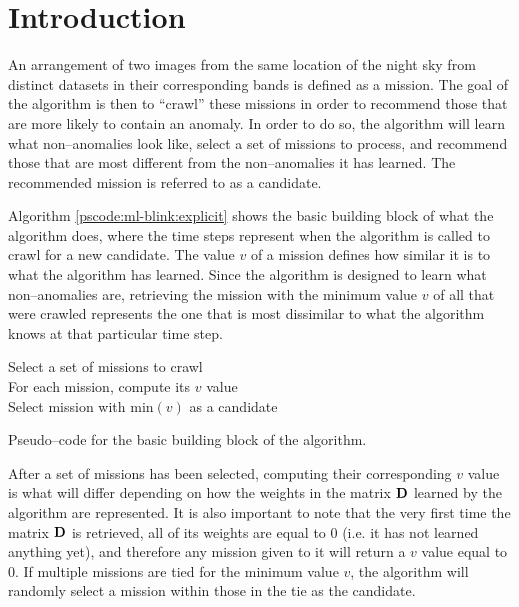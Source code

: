 \section{Introduction} \label{sect:meth:intro}

An arrangement of two images from the same location of the night sky from distinct datasets in their corresponding bands is defined as a mission. The goal of the \mlblink algorithm is then to ``crawl'' these missions in order to recommend those that are more likely to contain an anomaly. In order to do so, the \mlblink algorithm will learn what non--anomalies look like,  select a set of missions to process, and recommend those that are most different from the non--anomalies it has learned. The recommended mission is referred to as a candidate.  \newline

Algorithm \ref{pscode:ml-blink:explicit} shows the basic building block of what the \mlblink algorithm does, where the time steps represent when the algorithm is called to crawl for a new candidate. The value $v$ of a mission defines how similar it is to what the \mlblink algorithm has learned. Since the \mlblink algorithm is designed to learn what non--anomalies are, retrieving the mission with the minimum value $v$ of all that were crawled represents the one that is most dissimilar to what the \mlblink algorithm knows at that particular time step.

\vspace{0.4cm}
\begin{algorithm}[H]
    \SetAlgoLined
        \FMain{} {
             {
                Select a set of missions to crawl \\
                For each mission, compute its $v$ value \\
                Select mission with $\text{min}(v)$ as a candidate \\
            }
        }
    \caption{Pseudo--code for the basic building block of the \mlblink algorithm.}
    \label{pscode:ml-blink:explicit}
\end{algorithm}
\vspace{0.4cm}

After a set of missions has been selected, computing their corresponding $v$ value is what will differ depending on how the weights in the matrix $\boldsymbol{\mathbf{D}}$ learned by the algorithm are represented. It is also important to note that the very first time the matrix $\boldsymbol{\mathbf{D}}$ is retrieved, all of its weights are equal to $0$ (i.e. it has not learned anything yet), and therefore any mission given to it will return a $v$ value equal to $0$. If multiple missions are tied for the minimum value $v$, the \mlblink algorithm will randomly select a mission within those in the tie as the candidate.